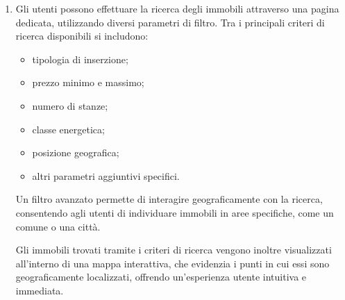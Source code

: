 \documentclass{article}
\begin{document}
\begin{enumerate}
          \begin{itemize}
              \item foto;
              \item descrizione;
              \item prezzo;
              \item dimensioni;
              \item indirizzo;
              \item numero di stanze;
              \item piano;
              \item presenza di ascensore;
              \item classe energetica;
              \item ulteriori servizi presenti (ad esempio, portineria, climatizzazione, ecc.).
          \end{itemize}

          Inoltre, nella medesima pagina, sarà disponibile una mappa digitale che mostra la posizione geografica dell’immobile, fornendo così un'esperienza utente più chiara e completa.

    \item Gli utenti possono effettuare la ricerca degli immobili attraverso una pagina dedicata, utilizzando diversi parametri di filtro. Tra i principali criteri di ricerca disponibili si includono:

          \begin{itemize}
              \item tipologia di inserzione;
              \item prezzo minimo e massimo;
              \item numero di stanze;
              \item classe energetica;
              \item posizione geografica;
              \item altri parametri aggiuntivi specifici.
          \end{itemize}

          Un filtro avanzato permette di interagire geograficamente con la ricerca, consentendo agli utenti di individuare immobili in aree specifiche, come un comune o una città.

          Gli immobili trovati tramite i criteri di ricerca vengono inoltre visualizzati all'interno di una mappa interattiva, che evidenzia i punti in cui essi sono geograficamente localizzati, offrendo un'esperienza utente intuitiva e immediata.


\end{enumerate}
\end{document}
